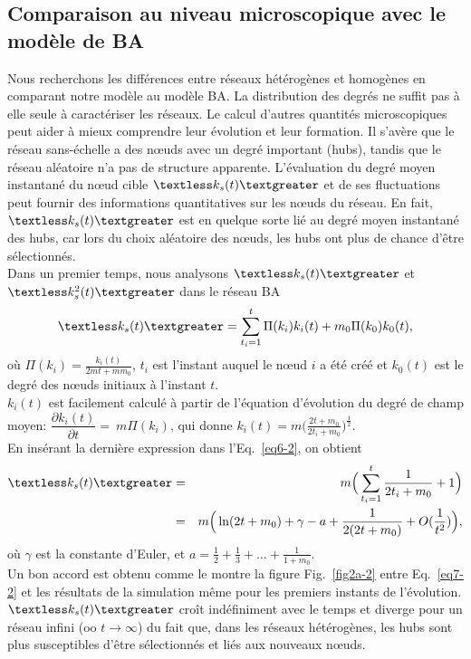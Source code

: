 \subsection{Comparaison au niveau microscopique avec le modèle de BA}
 Nous recherchons les différences entre réseaux hétérogènes et homogènes en comparant notre modèle au modèle BA. La distribution des degrés ne suffit pas à elle seule à caractériser les réseaux. Le calcul d'autres quantités microscopiques peut aider à mieux comprendre leur évolution et leur formation. Il s'avère que le réseau sans-échelle a des nœuds avec un degré important (hubs), tandis que le réseau aléatoire n'a pas de structure apparente. L'évaluation du degré moyen instantané du nœud cible $\kms$ et de ses fluctuations peut fournir des informations quantitatives sur les nœuds du réseau. En fait, $\kms$ est en quelque sorte lié au degré moyen instantané des hubs, car lors du choix aléatoire des nœuds, les hubs ont plus de chance d'être sélectionnés. \\  
 Dans un premier temps, nous analysons $\kms$ et $\kmss$ dans le réseau BA
 \begin{eqnarray}
 \kms=\sum_{t_i=1}^t\Pi(k_i)k_i(t)+m_0\Pi(k_0)k_0(t),
 \label{eq6-2}
 \end{eqnarray}
 où  $\Pi(k_i)=\frac{k_i(t)}{2mt+mm_0}$, $t_i$ est l'instant auquel le nœud $ i $ a été créé et $ k_0 (t) $ est le degré des nœuds initiaux à l'instant $t$.\\
 $k_i (t)$ est facilement calculé à partir de l'équation d'évolution du degré de champ moyen:
 $\dfrac{\partial k_i(t)}{\partial t}=~ m\Pi(k_i)$, qui donne $k_i(t)=m\Big(\frac{2t+m_0}{2t_i+m_0}\Big)^{\frac{1}{2}}$.\\
 En insérant la dernière expression dans l'Eq.~\eqref{eq6-2}, on obtient
 \begin{eqnarray}
 \kms&=&m\Big(\sum_{t_i=1}^{t}\dfrac{1}{2t_i+m_0}+1\Big) \\
 &=&m \Big(\ln (2t+m_0)+\gamma-a+\frac{1}{2(2t+m_0)}+O(\frac{1}{t^2})\Big),
 \label{eq7-2}
 \end{eqnarray}
 où $\gamma$ est la constante d'Euler, et $a=\frac{1}{2}+\frac{1}{3}+\ldots+\frac{1}{1+m_0}$.\\
 Un bon accord est obtenu comme le montre la figure Fig.~\ref{fig2a-2} entre Eq.~\eqref{eq7-2} et les résultats de la simulation même pour les premiers instants de l'évolution. $\kms$ croît indéfiniment avec le temps et diverge pour un réseau infini (oo $t\to\infty$) du fait que, dans les réseaux hétérogènes, les hubs sont plus susceptibles d'être sélectionnés et liés aux nouveaux nœuds. \\
